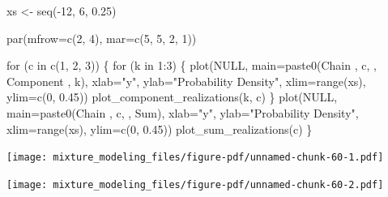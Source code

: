 \documentclass[
  letterpaper,
  DIV=11,
  numbers=noendperiod]{scrartcl}
\newenvironment{Shaded}{\begin{snugshade}}{\end{snugshade}}
\newcommand{\AttributeTok}[1]{\textcolor[rgb]{0.40,0.45,0.13}{#1}}
\newcommand{\ConstantTok}[1]{\textcolor[rgb]{0.56,0.35,0.01}{#1}}
\newcommand{\ControlFlowTok}[1]{\textcolor[rgb]{0.00,0.23,0.31}{#1}}
\newcommand{\DecValTok}[1]{\textcolor[rgb]{0.68,0.00,0.00}{#1}}
\newcommand{\FloatTok}[1]{\textcolor[rgb]{0.68,0.00,0.00}{#1}}
\newcommand{\FunctionTok}[1]{\textcolor[rgb]{0.28,0.35,0.67}{#1}}
\newcommand{\NormalTok}[1]{\textcolor[rgb]{0.00,0.23,0.31}{#1}}
\newcommand{\OtherTok}[1]{\textcolor[rgb]{0.00,0.23,0.31}{#1}}
\newcommand{\SpecialCharTok}[1]{\textcolor[rgb]{0.37,0.37,0.37}{#1}}
\newcommand{\StringTok}[1]{\textcolor[rgb]{0.13,0.47,0.30}{#1}}
\begin{document}
\begin{Shaded}
\begin{Highlighting}[]
\NormalTok{xs }\OtherTok{\textless{}{-}} \FunctionTok{seq}\NormalTok{(}\SpecialCharTok{{-}}\DecValTok{12}\NormalTok{, }\DecValTok{6}\NormalTok{, }\FloatTok{0.25}\NormalTok{)}

\FunctionTok{par}\NormalTok{(}\AttributeTok{mfrow=}\FunctionTok{c}\NormalTok{(}\DecValTok{2}\NormalTok{, }\DecValTok{4}\NormalTok{), }\AttributeTok{mar=}\FunctionTok{c}\NormalTok{(}\DecValTok{5}\NormalTok{, }\DecValTok{5}\NormalTok{, }\DecValTok{2}\NormalTok{, }\DecValTok{1}\NormalTok{))}

\ControlFlowTok{for}\NormalTok{ (c }\ControlFlowTok{in} \FunctionTok{c}\NormalTok{(}\DecValTok{1}\NormalTok{, }\DecValTok{2}\NormalTok{, }\DecValTok{3}\NormalTok{)) \{}
  \ControlFlowTok{for}\NormalTok{ (k }\ControlFlowTok{in} \DecValTok{1}\SpecialCharTok{:}\DecValTok{3}\NormalTok{) \{}
    \FunctionTok{plot}\NormalTok{(}\ConstantTok{NULL}\NormalTok{, }\AttributeTok{main=}\FunctionTok{paste0}\NormalTok{(}\StringTok{\textquotesingle{}Chain \textquotesingle{}}\NormalTok{, c, }\StringTok{\textquotesingle{}, Component \textquotesingle{}}\NormalTok{, k),}
         \AttributeTok{xlab=}\StringTok{"y"}\NormalTok{, }\AttributeTok{ylab=}\StringTok{"Probability Density"}\NormalTok{,}
         \AttributeTok{xlim=}\FunctionTok{range}\NormalTok{(xs), }\AttributeTok{ylim=}\FunctionTok{c}\NormalTok{(}\DecValTok{0}\NormalTok{, }\FloatTok{0.45}\NormalTok{))}
    \FunctionTok{plot\_component\_realizations}\NormalTok{(k, c)}
\NormalTok{  \}}
  \FunctionTok{plot}\NormalTok{(}\ConstantTok{NULL}\NormalTok{, }\AttributeTok{main=}\FunctionTok{paste0}\NormalTok{(}\StringTok{\textquotesingle{}Chain \textquotesingle{}}\NormalTok{, c, }\StringTok{\textquotesingle{}, Sum\textquotesingle{}}\NormalTok{),}
       \AttributeTok{xlab=}\StringTok{"y"}\NormalTok{, }\AttributeTok{ylab=}\StringTok{"Probability Density"}\NormalTok{,}
       \AttributeTok{xlim=}\FunctionTok{range}\NormalTok{(xs), }\AttributeTok{ylim=}\FunctionTok{c}\NormalTok{(}\DecValTok{0}\NormalTok{, }\FloatTok{0.45}\NormalTok{))}
  \FunctionTok{plot\_sum\_realizations}\NormalTok{(c)}
\NormalTok{\}}
\end{Highlighting}
\end{Shaded}

\texttt{[image: mixture\_modeling\_files/figure-pdf/unnamed-chunk-60-1.pdf]}

\texttt{[image: mixture\_modeling\_files/figure-pdf/unnamed-chunk-60-2.pdf]}
\end{document}

